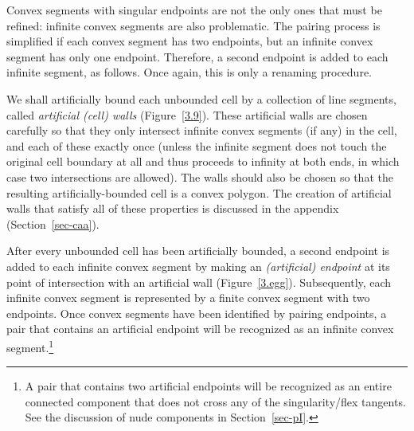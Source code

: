 Convex segments with singular endpoints are not the only ones that must
be refined: infinite convex segments are also problematic.
The pairing process is simplified if each convex segment has two endpoints,
but an infinite convex segment has only one endpoint.
Therefore, a second endpoint is added to each infinite segment, as follows.
Once again, this is only a renaming procedure.

We shall artificially bound each unbounded cell by a collection of line segments,
called {\em artificial (cell) walls} (Figure~\ref{3.9}).
These artificial walls are chosen carefully so that they only intersect 
infinite convex segments (if any) in the cell, and each of these exactly once 
(unless the infinite segment does not touch the original cell boundary at all
and thus proceeds
to infinity at both ends, in which case two intersections are allowed).
The walls should also be chosen so that the resulting artificially-bounded cell 
is a convex polygon.
The creation of artificial walls that satisfy all of these properties
is discussed in the appendix (Section~\ref{sec-caa}).


After every unbounded cell has been artificially bounded, a second endpoint
is added to each infinite convex segment by making an {\em (artificial) endpoint} 
at its point of intersection with an artificial wall (Figure~\ref{3.egg}).
Subsequently, each infinite convex segment is represented by a finite convex
segment with two endpoints.
Once convex segments have been identified by pairing endpoints, 
a pair that contains an artificial endpoint will be recognized as an infinite convex 
segment.\footnote{A pair that contains two artificial endpoints will be recognized as 
	an entire connected component that does not cross any of the singularity/flex 
	tangents. See the discussion of nude components in Section~\ref{sec-pI}.}

